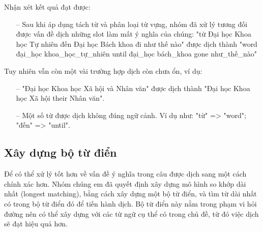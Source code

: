 Nhận xét kết quả đạt được:
\begin{itemize}
    \item[--] Sau khi áp dụng tách từ và phân loại từ vựng, nhóm đã xử lý tương đối được vấn đề dịch những slot làm mất ý nghĩa của chúng: "từ Đại học Khoa học Tự nhiên đến Đại học Bách khoa đi như thế nào" được dịch thành "word đại\_học khoa\_học\_tự\_nhiên until đại\_học bách\_khoa gone như\_thế\_nào"
\end{itemize}
Tuy nhiên vẫn còn một vài trường hợp dịch còn chưa ổn, ví dụ:
 \begin{itemize}
 \item[--] "Đại học Khoa học Xã hội và Nhân văn" được dịch thành "Đại học Khoa học Xã hội their Nhân văn".
 \item[--] Một số từ được dịch không đúng ngữ cảnh. Ví dụ như: "từ" => "word"; "đến" => "until".
 \end{itemize}


\subsection{Xây dựng bộ từ điển}
Để có thể xử lý tốt hơn về vấn đề ý nghĩa trong câu được dịch sang một cách chính xác hơn. Nhóm chúng em đã quyết định xây dựng mô hình so khớp dài nhất (longest matching), bằng cách xây dựng một bộ từ điển, và tìm từ dài nhất có trong bộ từ điển đó để tiến hành dịch. Bộ từ điển này nằm trong phạm vi hỏi đường nên có thể xây dựng với các từ ngữ cụ thể có trong chủ đề, từ đó việc dịch sẽ đạt hiệu quả hơn.

